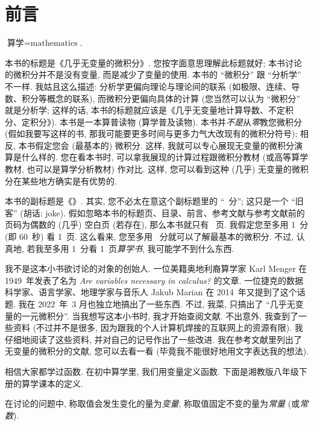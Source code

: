 \chapter*{前言}

\begin{definition*}
    $\text{算学} = \text{mathematics}$.
\end{definition*}

本书的标题是《几乎无变量的微积分》. 您按字面意思理解此标题就好; 本书讨论的微积分并不是没有变量, 而是减少了变量的使用. 本书的 ``微积分'' 跟 ``分析学'' 不一样. 我姑且这么描述: 分析学更偏向理论与理论间的联系 (如极限、连续、导数、积分等概念的联系), 而微积分更偏向具体的计算 (您当然可以认为 ``微积分'' 就是分析学; 这样的话, 本书的标题就应该是《几乎无变量地计算导数、不定积分、定积分》). 本书是一本算普读物 (算学普及读物). 本书并\emph{不是}从\emph{零}教您微积分 (假如我要写这样的书, 那我可能要更多时间与更多力气大改现有的微积分符号); 相反, 本书假定您会 (最基本的) 微积分. 这样, 我就可以专心展现无变量的微积分演算是什么样的. 您在看本书时, 可以拿我展现的计算过程跟微积分教材 (或高等算学教材, 也可以是算学分析教材) 作对比. 这样, 您可以看到这种 (几乎) 无变量的微积分在某些地方确实是有优势的.

本书的副标题是《\CalculusSubtitle 》. 其实, 您不必太在意这个副标题里的 ``\pageref{calculus:LastPage}~分''; 这只是一个 ``旧客'' (胡话: joke). 假如忽略本书的标题页、目录、前言、参考文献与参考文献前的页码为偶数的 (几乎) 空白页 (若存在), 那么本书就只有 \pageref{calculus:LastPage}~页. 我假定您至多用 1~分 (即 60~秒) 看 1~页. 这么看来, 您至多用 \pageref{calculus:LastPage}~分就可以了解最基本的微积分. 不过, 认真地, 若我至多用 1~分看 1~页\emph{算学书}, 我可能学不到什么东西.

我不是这本小书欲讨论的对象的创始人. 一位美籍奥地利裔算学家 Karl Menger 在 1949~年发表了名为 \textit{Are variables necessary in calculus?} 的文章. 一位捷克的数据科学家、语言学家、地理学家与音乐人 Jakub Marian 在 2014~年又提到了这个话题. 我在 2022~年~3 月也独立地搞出了一些东西. 不过, 我菜, 只搞出了 ``几乎无变量的一元微积分''. 当我想写这本小书时, 我才开始查阅文献. 不出意外, 我查到了一些资料 (不过并不是很多, 因为跟我的个人计算机焊接的互联网上的资源有限). 我仔细地阅读了这些资料, 并对自己的记号作出了一些改进. 我在参考文献里列出了无变量的微积分的文献, 您可以去看一看 (毕竟我不能很好地用文字表达我的想法).

相信大家都学过函数. 在初中算学里, 我们用变量定义函数. 下面是湘教版八年级下册的算学课本的定义.

\begin{definition*}
    在讨论的问题中, 称取值会发生变化的量为\emph{变量}, 称取值固定不变的量为\emph{常量} (或\emph{常数}).
\end{definition*}

